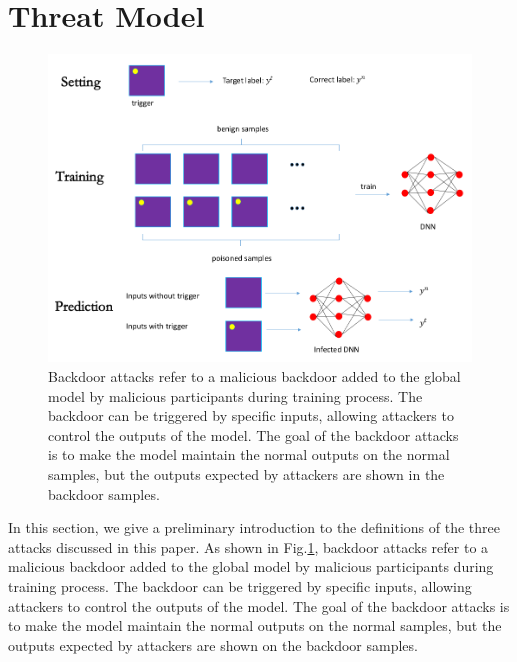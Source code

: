 \documentclass[conference]{IEEEtran}
\begin{document}
\section{Threat Model}
\begin{figure}[htbp]
    \centerline{\includegraphics[width=0.8\linewidth,height=0.6\linewidth]{picture/backdoor_attack.png}}
    \caption{Backdoor attacks refer to a malicious backdoor 
    added to the global model by malicious participants during training process. 
    The backdoor can be triggered by specific inputs, 
    allowing attackers to control the outputs of the model. 
    The goal of the backdoor attacks is to make the model maintain the normal 
    outputs on the normal samples, but the outputs expected by attackers are 
    shown in the backdoor samples.}
    \label{fig2}
\end{figure}

In this section, we give a preliminary introduction to the definitions of the three attacks discussed in this paper.
As shown in Fig.\ref{fig2}, backdoor attacks\cite{b16,b17,b18,b19,b20} refer to a malicious backdoor 
added to the global model by malicious participants during training process. 
The backdoor can be triggered by specific inputs, 
allowing attackers to control the outputs of the model. 
The goal of the backdoor attacks is to make the model maintain the normal 
outputs on the normal samples, but the outputs expected by attackers are 
shown on the backdoor samples.
\end{document}
